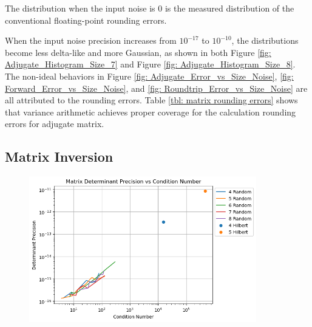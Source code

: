 \documentclass[twoside]{article}
\numberwithin{equation}{section}
\begin{document}
The distribution when the input noise is $0$ is the measured distribution of the conventional floating-point rounding errors.

When the input noise precision increases from $10^{-17}$ to  $10^{-10}$, the distributions become less delta-like and more Gaussian, as shown in both Figure \ref{fig: Adjugate_Histogram_Size_7} and Figure \ref{fig: Adjugate_Histogram_Size_8}. 
The non-ideal behaviors in Figure \ref{fig: Adjugate_Error_vs_Size_Noise}, \ref{fig: Forward_Error_vs_Size_Noise}, and \ref{fig: Roundtrip_Error_vs_Size_Noise} are all attributed to the rounding errors.
Table \ref{tbl: matrix rounding errors} shows that variance arithmetic achieves proper coverage for the calculation rounding errors for adjugate matrix.



\subsection{Matrix Inversion}

\begin{figure}[p]
\centering
\includegraphics[height=2.5in]{Matrix_Determinant_Prec_vs_Condition.png} 
\label{fig: Matrix_Determinant_Prec_vs_Condition}
\end{figure}

\iffalse
\end{document}
